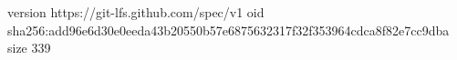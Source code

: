 version https://git-lfs.github.com/spec/v1
oid sha256:add96e6d30e0eeda43b20550b57e6875632317f32f353964cdca8f82e7cc9dba
size 339
